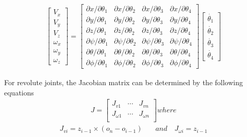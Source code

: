 \documentclass[paper=letter, fontsize=10pt]{scrartcl}	%
\numberwithin{equation}{section}															%
\numberwithin{figure}{section}																%
\numberwithin{table}{section}																%
\begin{document}
\begin{align} \label{eq:Jacobian}
	\begin{bmatrix} V_x \\
	V_y \\
	V_z \\
	\omega_x \\
	\omega_y \\
	\omega_z
	\end{bmatrix} = 
	\begin{bmatrix}
	\partial x / \partial \theta_1 & \partial x / \partial \theta_2 & \partial x / \partial \theta_3 & \partial x / \partial \theta_4 \\
  	\partial y / \partial \theta_1 & \partial y / \partial \theta_2 & \partial y / \partial \theta_3 & \partial y / \partial \theta_4 \\
  	\partial z / \partial \theta_1 & \partial z / \partial \theta_2 & \partial z / \partial \theta_3 & \partial z / \partial \theta_4 \\
  	\partial \psi / \partial \theta_1 & \partial \psi / \partial \theta_2 & \partial \psi / \partial \theta_3 & \partial \psi / \partial \theta_4 \\
  	\partial \theta / \partial \theta_1 & \partial \theta / \partial \theta_2 & \partial \theta / \partial \theta_3 & \partial \theta / \partial \theta_4 \\
  	\partial \phi / \partial \theta_1 & \partial \phi / \partial \theta_2 & \partial \phi / \partial \theta_3 & \partial \phi / \partial \theta_4
	\end{bmatrix}
	\begin{bmatrix} \dot{\theta_1} \\
	\dot{\theta_2} \\
	\dot{\theta_3} \\
	\dot{\theta_4}
	\end{bmatrix}
\end{align}

For revolute joints, the Jacobian matrix can be determined by the following equations
\begin{align} \label{eq:Jacobian2}
	J = 
	\begin{bmatrix}
	J_{v1} & \cdots  & J_{vn} \\
  	J_{\omega 1} & \cdots & J_{\omega n} \\
	\end{bmatrix} where
\end{align}
\begin{align}
{J_{vi}} = {z_{i - 1}} \times ({o_n} - {o_{i - 1}})\quad & and \quad {J_{\omega i}} = {z_{i - 1}}
\end{align}
\end{document}

